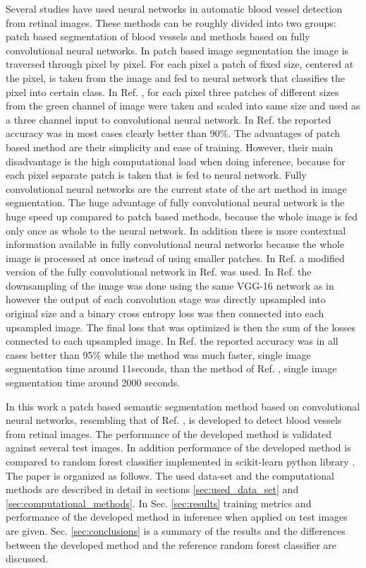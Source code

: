 \documentclass[aps,prb,10pt,twocolumn,groupedaddress]{revtex4-1}
\begin{document}
Several studies have used neural networks in automatic blood vessel detection from retinal images. These methods can be roughly divided into two groups: patch based segmentation of blood vessels\cite{tan} and methods based on fully convolutional neural networks\cite{long,hu}. In patch based image segmentation the image is traversed through pixel by pixel. For each pixel a patch of fixed size, centered at the pixel, is taken from the image and fed to neural network that classifies the pixel into certain class. In Ref. \cite{tan}, for each pixel three patches of different sizes from the green channel of image were taken and scaled into same size and used as a three channel input to convolutional neural network. In Ref. \cite{tan} the reported accuracy was in most cases clearly better than 90\%. 
The advantages of patch based method are their simplicity and ease of training. However, their main disadvantage is the high computational load when doing inference, because for each pixel separate patch is taken that is fed to neural network. Fully convolutional neural networks\cite{long} are the current state of the art method in image segmentation. The huge advantage of fully convolutional neural network is the huge speed up compared to patch based methods, because the whole image is fed only once as whole to the neural network. In addition there is more contextual information available in fully convolutional neural networks because the whole image is processed at once instead of using smaller patches. In Ref. \cite{hu} a modified version of the fully convolutional network in Ref. \cite{long} was used. In Ref. \cite{hu} the downsampling of the image was done using the same VGG-16 network as in \cite{long} however the output of each convolution stage was directly upsampled into original size and a binary cross entropy loss was then connected into each upsampled image. The final loss that was optimized is then the sum of the losses connected to each upsampled image. In Ref. \cite{hu} the reported accuracy was in all cases better than 95\% while the method was much faster, single image segmentation time around 11seconds, than the method of Ref. \cite{tan}, single image segmentation time around 2000 seconds.  

In this work a patch based semantic segmentation method based on convolutional neural networks, resembling that of Ref. \cite{tan},  is developed to detect blood vessels from retinal images. The performance of the developed method is validated against several test images. In addition performance of the developed method is compared to random forest classifier implemented in scikit-learn python library \cite{scikit-learn}.
The paper is organized as follows. The used data-set and the computational
methods are described in detail in sections \ref{sec:used_data_set} and \ref{sec:computational_methods}. In Sec. \ref{sec:results} training metrics and performance of the developed method in inference when applied on test images are given.
Sec. \ref{sec:conclusions} is a summary of the results and the differences between the developed method and the reference random forest classifier are discussed.
\end{document}
